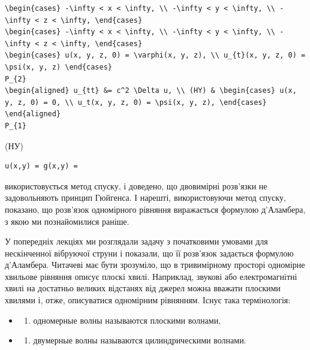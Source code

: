 \documentclass[
  ukrainian,
]{article}
\providecommand{\tightlist}{%
  \setlength{\itemsep}{0pt}\setlength{\parskip}{0pt}}
\begin{document}
\begin{verbatim}
\begin{cases} -\infty < x < \infty, \\ -\infty < y < \infty, \\ -\infty < z < \infty, \end{cases}
\begin{cases} -\infty < x < \infty, \\ -\infty < y < \infty, \\ -\infty < z < \infty, \end{cases}
\begin{cases} u(x, y, z, 0) = \varphi(x, y, z), \\ u_{t}(x, y, z, 0) = \psi(x, y, z) \end{cases}
P_{2}
\begin{aligned} u_{tt} &= c^2 \Delta u, \\ (HY) & \begin{cases} u(x, y, z, 0) = 0, \\ u_t(x, y, z, 0) = \psi(x, y, z), \end{cases} \end{aligned}
P_{1}
\end{verbatim}

(НУ)

\begin{verbatim}
u(x,y) = g(x,y) =
\end{verbatim}

використовується метод спуску, і доведено, що двовимірні розв'язки не
задовольняють принцип Гюйгенса. І нарешті, використовуючи метод спуску,
показано, що розв'язок одномірного рівняння виражається формулою
д'Аламбера, з якою ми познайомилися раніше.

У попередніх лекціях ми розглядали задачу з початковими умовами для
нескінченної вібруючої струни і показали, що її розв'язок задається
формулою д'Аламбера. Читачеві має бути зрозуміло, що в тривимірному
просторі одномірне хвильове рівняння описує плоскі хвилі. Наприклад,
звукові або електромагнітні хвилі на достатньо великих відстанях від
джерел можна вважати плоскими хвилями і, отже, описуватися одномірним
рівнянням. Існує така термінологія:

\begin{itemize}
\tightlist
\item
  \begin{enumerate}
  \def\labelenumi{\arabic{enumi})}
  \tightlist
  \item
    одномерные волны называются плоскими волнами,
  \end{enumerate}
\item
  \begin{enumerate}
  \def\labelenumi{\arabic{enumi})}
  \setcounter{enumi}{1}
  \tightlist
  \item
    двумерные волны называются цилиндрическими волнами.
  \end{enumerate}
\end{itemize}
\end{document}
